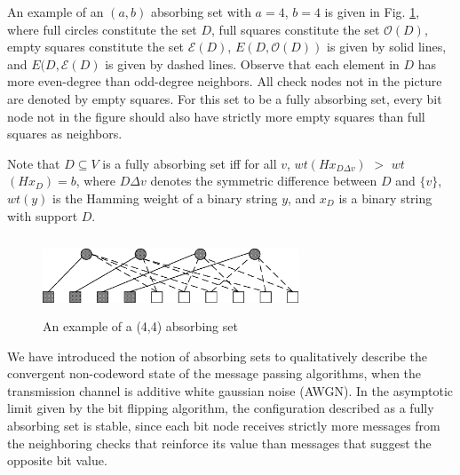 An example of an $(a,b)$ absorbing set with $a=4$, $b=4$ is given
in Fig. \ref{abs44}, where full circles constitute the set $D$,
full squares constitute the set $\mathcal{O}(D)$, empty squares
constitute the set $\mathcal{E}(D)$, $E(D,\mathcal{O}(D))$ is
given by solid lines, and $E(D,\mathcal{E}(D)$ is given by dashed
lines. Observe that each element in $D$ has more even-degree than
odd-degree neighbors. All check nodes not in the picture are
denoted by empty squares. For this set to be a fully absorbing
set, every bit node not in the figure should also have strictly
more empty squares than full squares as neighbors.




Note that $D \subseteq V$ is a fully absorbing set iff for all $v$,
$wt$$(Hx_{D \Delta v})$ $>$ $wt$$(Hx_D)=b$, where $D \Delta v$
denotes the symmetric difference between $D$ and $\{v\}$, $wt(y)$ is
the Hamming weight of a binary string $y$, and $x_D$ is a binary
string with support $D$.

\begin{figure}
\center\includegraphics[width=3.0in,height=0.9in]{Drawing11.eps}
\caption{An example of a (4,4) absorbing set} \label{abs44}
\end{figure}





We have introduced the notion of absorbing sets to qualitatively
describe the convergent non-codeword state of the message passing
algorithms, when the transmission channel is additive white
gaussian noise (AWGN). In the asymptotic limit given by the bit
flipping algorithm, the configuration described as a fully
absorbing set is stable, since each bit node receives strictly
more messages from the neighboring checks that reinforce its value
than messages that suggest the opposite bit value.

